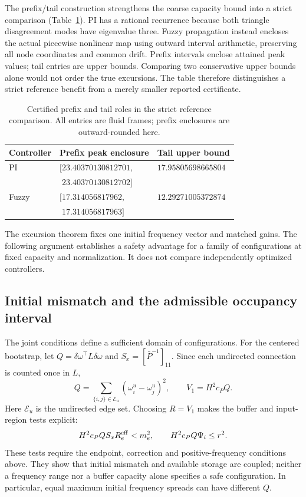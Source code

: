 The prefix/tail construction strengthens the coarse capacity bound
into a strict comparison (Table~\ref{tab:btd_prefix_tail}). PI has
a rational recurrence because both triangle disagreement modes
have eigenvalue three. Fuzzy propagation instead encloses the actual
piecewise nonlinear map using outward interval arithmetic, preserving
all node coordinates and common drift. Prefix intervals enclose attained
peak values; tail entries are upper bounds. Comparing two conservative
upper bounds alone would not order the true excursions. The table
therefore distinguishes a strict reference benefit from a merely
smaller reported certificate.

\begin{table}[t]
\caption{Certified prefix and tail roles in the strict reference comparison.
All entries are fluid frames; prefix enclosures are outward-rounded here.}
\label{tab:btd_prefix_tail}
\centering
\begin{tabular}{@{}lll@{}}\toprule
Controller & Prefix peak enclosure & Tail upper bound\\\midrule
PI & $[23.40370130812701,$ & $17.95805698665804$\\
 & $\phantom{[}23.40370130812702]$ & \\
Fuzzy & $[17.314056817962,$ & $12.29271005372874$\\
 & $\phantom{[}17.314056817963]$ & \\\bottomrule
\end{tabular}
\end{table}

The excursion theorem fixes one initial frequency vector and matched
gains. The following argument establishes a safety advantage for a
family of configurations at fixed capacity and normalization.
It does not compare independently optimized controllers.

\subsection{Initial mismatch and the admissible occupancy interval}
\label{subsec:btd_occupancy_domain}
The joint conditions define a sufficient domain of configurations.
For the centered bootstrap, let
$Q=\delta\omega^\top L\delta\omega$ and
$S_x=[\bar P^{-1}]_{11}$. Since each undirected connection is
counted once in $L$,
\begin{equation}
 Q=\sum_{\{i,j\}\in\mathcal E_u}(\omega_i^u-\omega_j^u)^2,
 \qquad V_1=H^2c_PQ.
 \label{eq:btd_mismatch_energy}
\end{equation}
Here $\mathcal E_u$ is the undirected edge set. Choosing $R=V_1$
makes the buffer and input-region tests explicit:
\begin{equation}
 H^2c_PQ S_xR_e^{\rm eff}<m_e^2,\qquad
 H^2c_PQ\Psi_i\le r^2.
 \label{eq:btd_configuration_slice}
\end{equation}
These tests require the endpoint, correction and positive-frequency
conditions above. They show that initial mismatch and available
storage are coupled; neither a frequency range nor a buffer capacity
alone specifies a safe configuration. In particular, equal maximum
initial frequency spreads can have different $Q$.

